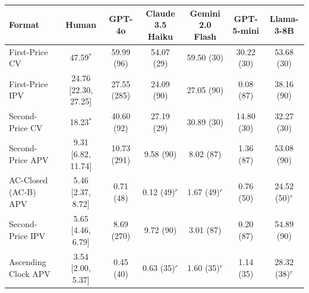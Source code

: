 \begin{tabular}{lcccccc}
\toprule
Format & Human & GPT-4o & Claude 3.5 Haiku & Gemini 2.0 Flash & GPT-5-mini & Llama-3-8B \\
\midrule
First-Price CV & 47.59$^{\ast}$ & 59.99 {\scriptsize (96)} & 54.07 {\scriptsize (29)} & 59.50 {\scriptsize (30)} & 30.22 {\scriptsize (30)} & 53.68 {\scriptsize (30)} \\
First-Price IPV & 24.76 [22.30, 27.25] & 27.55 {\scriptsize (285)} & 24.09 {\scriptsize (90)} & 27.05 {\scriptsize (90)} & 0.08 {\scriptsize (87)} & 38.16 {\scriptsize (90)} \\
Second-Price CV & 18.23$^{\ast}$ & 40.60 {\scriptsize (92)} & 27.19 {\scriptsize (29)} & 30.89 {\scriptsize (30)} & 14.80 {\scriptsize (30)} & 32.27 {\scriptsize (30)} \\
Second-Price APV & 9.31 [6.82, 11.74] & 10.73 {\scriptsize (291)} & 9.58 {\scriptsize (90)} & 8.02 {\scriptsize (87)} & 1.36 {\scriptsize (87)} & 53.08 {\scriptsize (90)} \\
AC-Closed (AC-B) APV & 5.46 [2.37, 8.72] & 0.71 {\scriptsize (48)} & 0.12 {\scriptsize (49)}$^{r}$ & 1.67 {\scriptsize (49)}$^{r}$ & 0.76 {\scriptsize (50)} & 24.52 {\scriptsize (50)}$^{r}$ \\
Second-Price IPV & 5.65 [4.46, 6.79] & 8.69 {\scriptsize (270)} & 9.72 {\scriptsize (90)} & 3.01 {\scriptsize (87)} & 0.20 {\scriptsize (87)} & 54.89 {\scriptsize (90)} \\
Ascending Clock APV & 3.54 [2.00, 5.37] & 0.45 {\scriptsize (40)} & 0.63 {\scriptsize (35)}$^{r}$ & 1.60 {\scriptsize (35)}$^{r}$ & 1.14 {\scriptsize (35)} & 28.32 {\scriptsize (38)}$^{r}$ \\
\bottomrule
\end{tabular}
